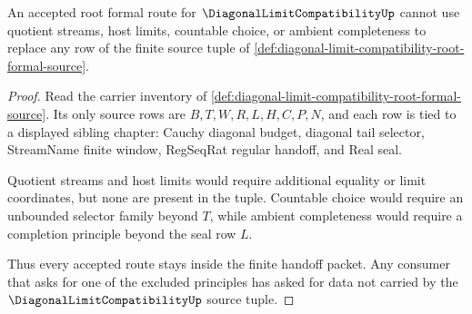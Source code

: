 \begin{theorem}
\label{thm:diagonal-limit-compatibility-root-formal-nonescape}
An accepted root formal route for $\DiagonalLimitCompatibilityUp$ cannot use quotient streams, host limits, countable choice, or ambient completeness to replace any row of the finite source tuple of \autoref{def:diagonal-limit-compatibility-root-formal-source}.
\end{theorem}
\begin{proof}
Read the carrier inventory of \autoref{def:diagonal-limit-compatibility-root-formal-source}. Its only source rows are $B,T,W,R,L,H,C,P,N$, and each row is tied to a displayed sibling chapter: Cauchy diagonal budget, diagonal tail selector, StreamName finite window, RegSeqRat regular handoff, and Real seal.

Quotient streams and host limits would require additional equality or limit coordinates, but none are present in the tuple. Countable choice would require an unbounded selector family beyond $T$, while ambient completeness would require a completion principle beyond the seal row $L$.

Thus every accepted route stays inside the finite handoff packet. Any consumer that asks for one of the excluded principles has asked for data not carried by the $\DiagonalLimitCompatibilityUp$ source tuple.
\end{proof}

